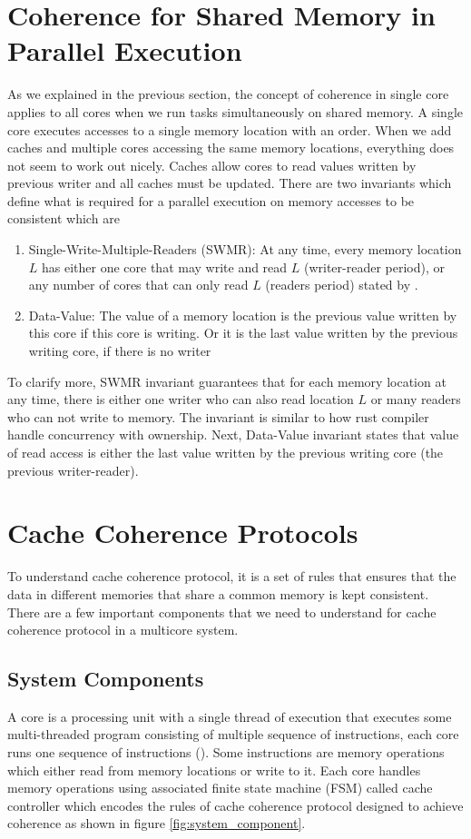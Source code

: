 \section{Coherence for Shared Memory in Parallel Execution}
As we explained in the previous section, the concept of coherence in single core applies to all cores when we run tasks
simultaneously on shared memory. A single core executes accesses to a single memory location with an order. When we add caches and multiple cores accessing the same memory locations,
everything does not seem to work out nicely. Caches allow cores to read values written by previous writer and all caches must be updated.
There are two invariants which define what is required for a parallel execution on memory accesses to be consistent which are 
\begin{enumerate}
        \item Single-Write-Multiple-Readers (SWMR): At any time, every memory location $L$  has either one core that may write and read $L$ (writer-reader period), or any number of cores that can only read $L$ (readers period) stated by \cite{hay2012mesif}.
        \item Data-Value: The value of a memory location is the previous value written by this core if this core is writing. Or it is the last value written by the previous writing core, 
                if there is no writer
\end{enumerate}
To clarify more, SWMR invariant guarantees that for each memory location at any time, there is either one writer who can also read location $L$ or many readers who can not write to memory.
The invariant is similar to how rust compiler handle concurrency with ownership. Next, Data-Value invariant states that value of read access
is either the last value written by the previous writing core (the previous writer-reader).

\section{Cache Coherence Protocols}
To understand cache coherence protocol, it is a set of rules that ensures that the data in different memories that share a common memory is kept consistent.
There are a few important components that we need to understand for cache coherence protocol in a multicore system.

\subsection{System Components}
A core is a processing unit with a single thread of execution that executes some multi-threaded program consisting of multiple sequence of instructions, each core runs one sequence of instructions (\citealp*{hay2012mesif}).
Some instructions are memory operations which either read from memory locations or write to it. Each core handles memory operations using associated finite state machine (FSM) called cache controller which encodes the rules of cache coherence protocol designed to achieve coherence
as shown in figure \ref*{fig:system_component}.

